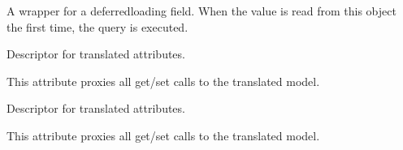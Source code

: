 \documentclass[letterpaper,10pt,french]{sphinxmanual}
\begin{document}
\begin{fulllineitems}
\begin{fulllineitems}
\label{\detokenize{index:bookings.models.OtherPrice.id}}
\pysigstartsignatures
\pysigline
{}
\pysigstopsignatures
\sphinxAtStartPar
A wrapper for a deferred\sphinxhyphen{}loading field. When the value is read from this
object the first time, the query is executed.

\end{fulllineitems}


\begin{fulllineitems}
\label{\detokenize{index:bookings.models.OtherPrice.price_tourist_tax}}
\pysigstartsignatures
\pysigline
{}
\pysigstopsignatures
\sphinxAtStartPar
Descriptor for translated attributes.

\sphinxAtStartPar
This attribute proxies all get/set calls to the translated model.

\end{fulllineitems}


\begin{fulllineitems}
\label{\detokenize{index:bookings.models.OtherPrice.tourist_tax_date}}
\pysigstartsignatures
\pysigline
{}
\pysigstopsignatures
\sphinxAtStartPar
Descriptor for translated attributes.

\sphinxAtStartPar
This attribute proxies all get/set calls to the translated model.

\end{fulllineitems}


\end{fulllineitems}

\end{document}
